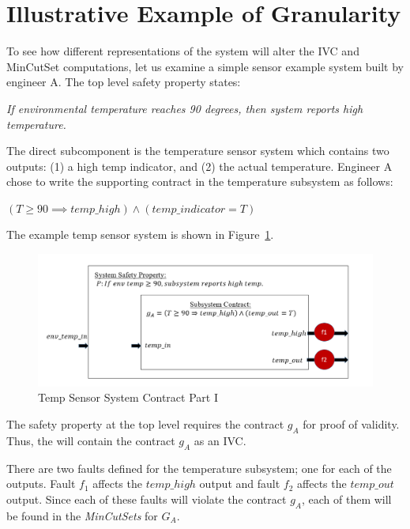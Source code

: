 \section{Illustrative Example of Granularity}
To see how different representations of the system will alter the IVC and MinCutSet computations, let us examine a simple sensor example system built by engineer A. The top level safety property states: 
\begin{center}
    \textit{If environmental temperature reaches 90 degrees, then system reports high temperature.}
\end{center}

The direct subcomponent is the temperature sensor system which contains two outputs: (1) a high temp indicator, and (2) the actual temperature. Engineer A chose to write the supporting contract in the temperature subsystem as follows: 
\begin{center}
    $(T \geq 90 \implies temp\_high) \land (temp\_indicator = T)$ 
\end{center}
  
The example temp sensor system is shown in Figure~\ref{fig:granularityEx1}.  

\begin{figure}[h]
\begin{center}
\includegraphics[width=14cm]{images/granularityEx1.PNG}
\caption{Temp Sensor System Contract Part I} \label{fig:granularityEx1}
\end{center}
\end{figure}

The safety property at the top level requires the contract $g_A$ for proof of validity. Thus, the \aivcalg will contain the contract $g_A$ as an IVC. 

There are two faults defined for the temperature subsystem; one for each of the outputs. Fault $f_1$ affects the $temp\_high$ output and fault $f_2$ affects the $temp\_out$ output. Since each of these faults will violate the contract $g_A$, each of them will be found in the \textit{MinCutSets} for $G_A$.

